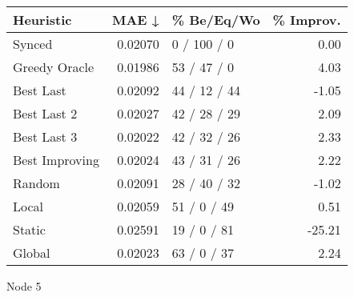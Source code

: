 \begin{tabular}{lrlr}
\toprule
\textbf{Heuristic} & \textbf{MAE ↓} & \textbf{\% Be/Eq/Wo} & \textbf{\% Improv.} \\
\midrule
            Synced &        0.02070 &          0 / 100 / 0 &                0.00 \\
     Greedy Oracle &        0.01986 &          53 / 47 / 0 &                4.03 \\
         Best Last &        0.02092 &         44 / 12 / 44 &               -1.05 \\
       Best Last 2 &        0.02027 &         42 / 28 / 29 &                2.09 \\
       Best Last 3 &        0.02022 &         42 / 32 / 26 &                2.33 \\
    Best Improving &        0.02024 &         43 / 31 / 26 &                2.22 \\
            Random &        0.02091 &         28 / 40 / 32 &               -1.02 \\
             Local &        0.02059 &          51 / 0 / 49 &                0.51 \\
            Static &        0.02591 &          19 / 0 / 81 &              -25.21 \\
            Global &        0.02023 &          63 / 0 / 37 &                2.24 \\
\bottomrule
\end{tabular}
\caption{Node 5}
\label{tab:iid_lr01_le2_bs2_5}
